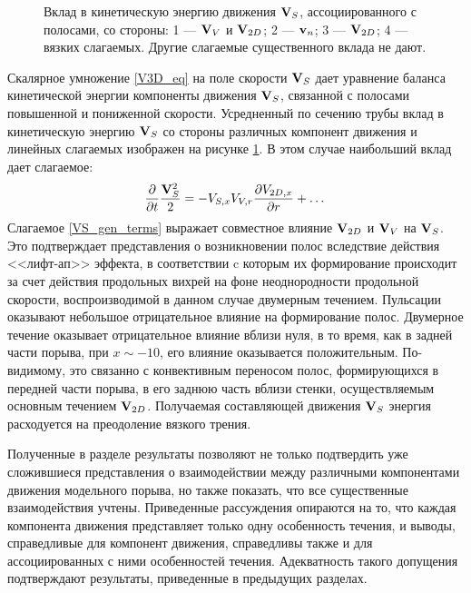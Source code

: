\begin{figure}
\caption{Вклад в кинетическую энергию движения $\mathbf{V}_S$, ассоциированного с полосами, со стороны: 1 --- $\mathbf{V}_V$ и $\mathbf{V}_{2D}$; 2 --- $\mathbf{v}_n$; 3 --- $\mathbf{V}_{2D}$; 4 --- вязких слагаемых. Другие слагаемые существенного вклада не дают.}
\label{es_parts_pic}
\end{figure}

Скалярное умножение \eqref{V3D_eq} на поле скорости $\mathbf{V}_S$ дает уравнение баланса кинетической энергии компоненты движения $\mathbf{V}_S$, связанной с полосами повышенной и пониженной скорости. Усредненный по сечению трубы вклад в кинетическую энергию $\mathbf{V}_S$ со стороны различных компонент движения и линейных слагаемых изображен на рисунке \ref{es_parts_pic}. В этом случае наибольший вклад дает слагаемое:
\begin{equation}\label{VS_gen_terms}
\frac{\partial }{\partial t}\frac{\mathbf{V}_S^2}{2} =  - V_{S, x} V_{V, r} \frac{\partial V_{2D, x}}{\partial r} + \dots
\end{equation}
Слагаемое \eqref{VS_gen_terms} выражает совместное влияние $\mathbf{V}_{2D}$ и $\mathbf{V}_V$ на $\mathbf{V}_S$. Это подтверждает представления о возникновении полос вследствие действия <<лифт-ап>> эффекта, в соответствии c которым их формирование происходит за счет действия продольных вихрей на фоне неоднородности продольной скорости, воспроизводимой в данном случае двумерным течением. Пульсации оказывают небольшое отрицательное влияние на формирование полос. Двумерное течение оказывает отрицательное влияние вблизи нуля, в то время, как в задней части порыва, при $x \sim -10$, его влияние оказывается положительным. По-видимому, это связанно с конвективным переносом полос, формирующихся в передней части порыва, в его заднюю часть вблизи стенки, осуществляемым основным течением $\mathbf{V}_{2D}$. Получаемая составляющей движения $\mathbf{V}_S$ энергия расходуется на преодоление вязкого трения.

Полученные в разделе результаты позволяют не только подтвердить уже сложившиеся представления о взаимодействии между различными компонентами движения модельного порыва, но также показать, что все существенные взаимодействия учтены. Приведенные рассуждения опираются на то, что каждая компонента движения представляет только одну особенность течения, и выводы, справедливые для компонент движения, справедливы также и для ассоциированных с ними особенностей течения. Адекватность такого допущения подтверждают результаты, приведенные в предыдущих разделах. 



